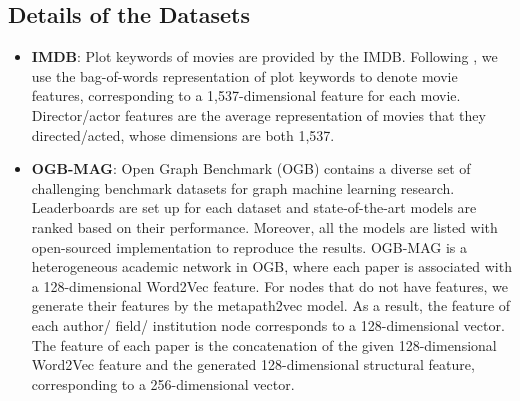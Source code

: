 \documentclass[10pt,journal,compsoc]{IEEEtran}
\begin{document}
\subsection*{Details of the Datasets} \label{section-appendix-datasets}
\begin{itemize}
    \item \textbf{IMDB}:
    Plot keywords of movies are provided by the IMDB. Following \cite{DBLP:conf/www/WangJSWYCY19}, we use the bag-of-words representation of plot keywords to denote movie features, corresponding to a 1,537-dimensional feature for each movie. Director/actor features are the average representation of movies that they directed/acted, whose dimensions are both 1,537.
    
    \item \textbf{OGB-MAG}:
    Open Graph Benchmark (OGB) \cite{DBLP:conf/nips/HuFZDRLCL20} contains a diverse set of challenging benchmark datasets for graph machine learning research. Leaderboards are set up for each dataset and state-of-the-art models are ranked based on their performance. Moreover, all the models are listed with open-sourced implementation to reproduce the results. OGB-MAG is a heterogeneous academic network in OGB, where each paper is associated with a 128-dimensional Word2Vec feature. For nodes that do not have features, we generate their features by the metapath2vec \cite{DBLP:conf/kdd/DongCS17} model.
    As a result, the feature of each author/ field/ institution node corresponds to a 128-dimensional vector. The feature of each paper is the concatenation of the given 128-dimensional Word2Vec feature and the generated 128-dimensional structural feature, corresponding to a 256-dimensional vector.
    

\end{itemize}
\end{document}
